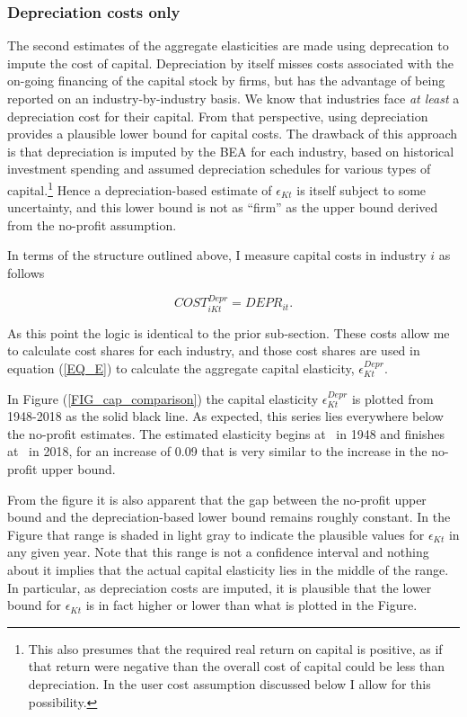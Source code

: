 \documentclass[11pt]{article}
\begin{document}
\subsubsection{Depreciation costs only}
The second estimates of the aggregate elasticities are made using deprecation to impute the cost of capital. Depreciation by itself misses costs associated with the on-going financing of the capital stock by firms, but has the advantage of being reported on an industry-by-industry basis. We know that industries face \textit{at least} a depreciation cost for their capital. From that perspective, using depreciation provides a plausible lower bound for capital costs. The drawback of this approach is that depreciation is imputed by the BEA for each industry, based on historical investment spending and assumed depreciation schedules for various types of capital.\footnote{This also presumes that the required real return on capital is positive, as if that return were negative than the overall cost of capital could be less than depreciation. In the user cost assumption discussed below I allow for this possibility.} Hence a depreciation-based estimate of $\epsilon_{Kt}$ is itself subject to some uncertainty, and this lower bound is not as ``firm'' as the upper bound derived from the no-profit assumption. 

In terms of the structure outlined above, I measure capital costs in industry $i$ as follows

\begin{equation}
	COST^{Depr}_{iKt} = DEPR_{it}. 
\end{equation}

As this point the logic is identical to the prior sub-section. These costs allow me to calculate cost shares for each industry, and those cost shares are used in equation (\ref{EQ_E}) to calculate the aggregate capital elasticity, $\epsilon_{Kt}^{Depr}$.

In Figure (\ref{FIG_cap_comparison}) the capital elasticity $\epsilon_{Kt}^{Depr}$ is plotted from 1948-2018 as the solid black line. As expected, this series lies everywhere below the no-profit estimates. The estimated elasticity begins at \basefirstdepr \ in 1948 and finishes at \baselastdepr \  in 2018, for an increase of 0.09 that is very similar to the increase in the no-profit upper bound. 

From the figure it is also apparent that the gap between the no-profit upper bound and the depreciation-based lower bound remains roughly constant. In the Figure that range is shaded in light gray to indicate the plausible values for $\epsilon_{Kt}$ in any given year. Note that this range is not a confidence interval and nothing about it implies that the actual capital elasticity lies in the middle of the range. In particular, as depreciation costs are imputed, it is plausible that the lower bound for $\epsilon_{Kt}$ is in fact higher or lower than what is plotted in the Figure.
\end{document}
